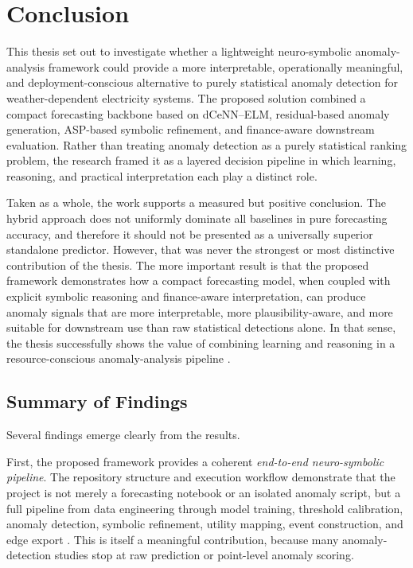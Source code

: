 \section{Conclusion}
\label{sec:conclusion_future_work}

This thesis set out to investigate whether a lightweight neuro-symbolic anomaly-analysis framework could provide a more interpretable, operationally meaningful, and deployment-conscious alternative to purely statistical anomaly detection for weather-dependent electricity systems. The proposed solution combined a compact forecasting backbone based on dCeNN--ELM, residual-based anomaly generation, ASP-based symbolic refinement, and finance-aware downstream evaluation. Rather than treating anomaly detection as a purely statistical ranking problem, the research framed it as a layered decision pipeline in which learning, reasoning, and practical interpretation each play a distinct role.

Taken as a whole, the work supports a measured but positive conclusion. The hybrid approach does not uniformly dominate all baselines in pure forecasting accuracy, and therefore it should not be presented as a universally superior standalone predictor. However, that was never the strongest or most distinctive contribution of the thesis. The more important result is that the proposed framework demonstrates how a compact forecasting model, when coupled with explicit symbolic reasoning and finance-aware interpretation, can produce anomaly signals that are more interpretable, more plausibility-aware, and more suitable for downstream use than raw statistical detections alone. In that sense, the thesis successfully shows the value of combining learning and reasoning in a resource-conscious anomaly-analysis pipeline \cite{repo_thesis_grid_anomaly}.

\subsection{Summary of Findings}
\label{subsec:summary_of_findings}

Several findings emerge clearly from the results.

First, the proposed framework provides a coherent \emph{end-to-end neuro-symbolic pipeline}. The repository structure and execution workflow demonstrate that the project is not merely a forecasting notebook or an isolated anomaly script, but a full pipeline from data engineering through model training, threshold calibration, anomaly detection, symbolic refinement, utility mapping, event construction, and edge export \cite{repo_thesis_grid_anomaly}. This is itself a meaningful contribution, because many anomaly-detection studies stop at raw prediction or point-level anomaly scoring.

